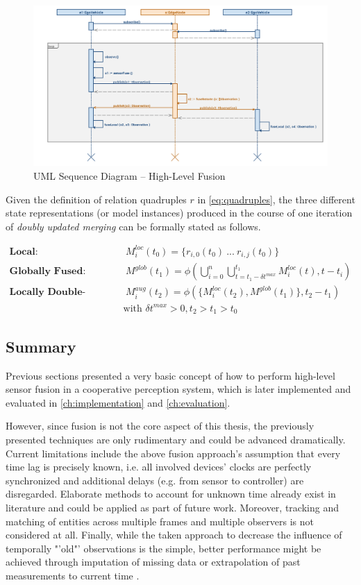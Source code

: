 \begin{figure}[H]
	\centering
	\includegraphics[width=1\linewidth]{98_images/sequence}
	\caption{UML Sequence Diagram – High-Level Fusion}
	\label{fig:sequence}
\end{figure}

Given the definition of relation quadruples $r$ in \cref{eq:quadruples}, the three different state representations (or model instances) produced in the course of one iteration of \textit{doubly updated merging} can be formally stated as follows.

\begin{align}
	\textbf{Local:\ } &\  M^{loc}_i(t_0) = \{ r_{i,0}(t_0)\ ...\ r_{i,j}(t_0)\} \\
	\textbf{Globally Fused:\ } &\  M^{glob}(t_1) = \phi(\bigcup^n_{i = 0} \bigcup^{t_1}_{t = t_1 - \delta t^{max}} M^{loc}_i(t), t-t_i) \\
	\textbf{Locally Double-Fused:\ } &\  M^{aug}_i(t_2) = \phi(\{ M^{loc}_i(t_2), M^{glob}(t_1) \}, t_2 - t_1)
\end{align}
\begin{gather*}
	\text{with\ } \delta t^{max} > 0, t_2 > t_1 > t_0
\end{gather*}

\subsection{Summary}
\label{subsec:concept_design:fusion_summary}
Previous sections presented a very basic concept of how to perform high-level sensor fusion in a cooperative perception system, which is later implemented and evaluated in \cref{ch:implementation} and \cref{ch:evaluation}. 

However, since fusion is not the core aspect of this thesis, the previously presented techniques are only rudimentary and could be advanced dramatically. Current limitations include the above fusion approach's assumption that every time lag is precisely known, i.e. all involved devices' clocks are perfectly synchronized and additional delays (e.g. from sensor to controller) are disregarded. Elaborate methods to account for unknown time already exist in literature \cite{Julier} and could be applied as part of future work. Moreover, tracking and matching of entities across multiple frames and multiple observers is not considered at all. Finally, while the taken approach to decrease the influence of temporally "'old"' observations is the simple, better performance might be achieved through imputation of missing data or extrapolation of past measurements to current time \cite{Chen2019}. 